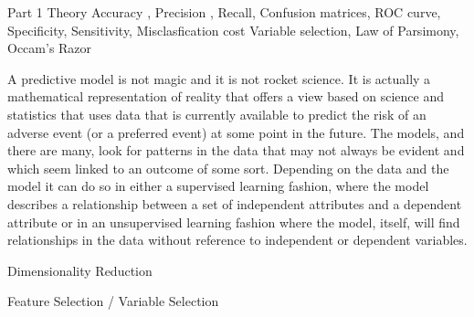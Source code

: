 Part 1 Theory 
Accuracy , Precision , Recall, Confusion matrices, ROC curve, Specificity, Sensitivity, Misclasfication cost
Variable selection, Law of Parsimony, Occam's Razor



A predictive model is not magic and it is not rocket science. It is actually a mathematical representation
of reality that offers a view based on science and statistics that uses data that is currently available to
predict the risk of an adverse event (or a preferred event) at some point in the future. The models, and
there are many, look for patterns in the data that may not always be evident and which seem linked to
an outcome of some sort. Depending on the data and the model it can do so in either a supervised
learning fashion, where the model describes a relationship between a set of independent attributes and
a dependent attribute or in an unsupervised learning fashion where the model, itself, will find
relationships in the data without reference to independent or dependent variables.



Dimensionality Reduction

Feature Selection / Variable Selection

